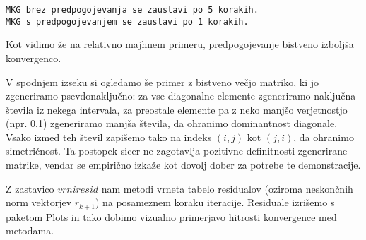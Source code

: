 \documentclass[12pt,a4paper]{article}
\begin{document}
\begin{lstlisting}
MKG brez predpogojevanja se zaustavi po 5 korakih.
MKG s predpogojevanjem se zaustavi po 1 korakih.
\end{lstlisting}


Kot vidimo že na relativno majhnem primeru, predpogojevanje bistveno izboljša konvergenco.


V spodnjem izseku si ogledamo še primer z bistveno večjo matriko, ki jo zgeneriramo psevdonaključno: za vse diagonalne elemente zgeneriramo naključna števila iz nekega intervala, za preostale elemente pa  z neko manjšo verjetnostjo (npr. 0.1) zgeneriramo manjša števila, da ohranimo dominantnost diagonale. Vsako izmed teh števil zapišemo tako na indeks $(i,j)$ kot $(j,i)$, da ohranimo simetričnost. Ta postopek sicer ne zagotavlja pozitivne definitnosti zgenerirane matrike, vendar se empirično izkaže kot dovolj dober za potrebe te demonstracije.


Z zastavico $\textit{vrniresid}$ nam metodi vrneta tabelo residualov (oziroma neskončnih norm vektorjev $r_{k+1}$) na posameznem koraku iteracije. Residuale izrišemo s paketom Plots in tako dobimo vizualno primerjavo hitrosti konvergence med metodama. 
\end{document}
